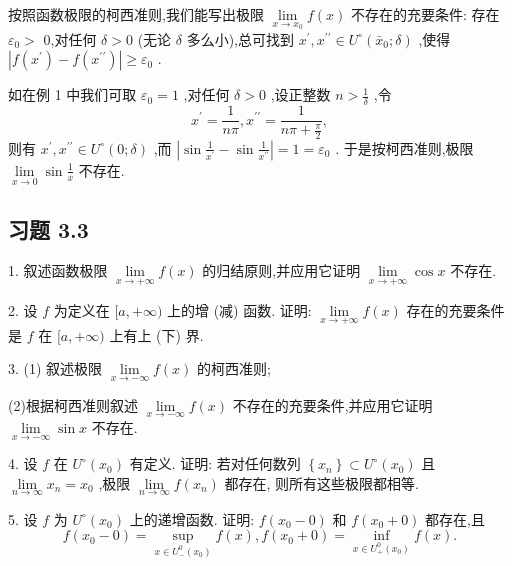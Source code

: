 按照函数极限的柯西准则,我们能写出极限 \(\mathop{\lim }\limits_{{x \rightarrow  {x}_{0}}}f\left( x\right)\) 不存在的充要条件: 存在 \({\varepsilon }_{0} >\) 0,对任何 \(\delta  > 0\) (无论 \(\delta\) 多么小),总可找到 \({x}^{\prime },{x}^{\prime \prime } \in  {U}^{ \circ  }\left( {{\bar{x}}_{0};\delta }\right)\) ,使得 \(\left| {f\left( {x}^{\prime }\right)  - f\left( {x}^{\prime \prime }\right) }\right|  \geq  {\varepsilon }_{0}\) .

如在例 1 中我们可取 \({\varepsilon }_{0} = 1\) ,对任何 \(\delta  > 0\) ,设正整数 \(n > \frac{1}{\delta }\) ,令
\[
{x}^{\prime } = \frac{1}{n\pi },{x}^{\prime \prime } = \frac{1}{{n\pi } + \frac{\pi }{2}},
\]
则有 \({x}^{\prime },{x}^{\prime \prime } \in  {U}^{ \circ  }\left( {0;\delta }\right)\) ,而 \(\left| {\sin \frac{1}{{x}^{\prime }} - \sin \frac{1}{{x}^{\prime \prime }}}\right|  = 1 = {\varepsilon }_{0}\) . 于是按柯西准则,极限 \(\mathop{\lim }\limits_{{x \rightarrow  0}}\sin \frac{1}{x}\) 不存在.

\subsection{习题 3.3}

1. 叙述函数极限 \(\mathop{\lim }\limits_{{x \rightarrow   + \infty }}f\left( x\right)\) 的归结原则,并应用它证明 \(\mathop{\lim }\limits_{{x \rightarrow   + \infty }}\cos x\) 不存在.

2. 设 \(f\) 为定义在 \(\lbrack a, + \infty )\) 上的增 (减) 函数. 证明: \(\mathop{\lim }\limits_{{x \rightarrow   + \infty }}f\left( x\right)\) 存在的充要条件是 \(f\) 在 \(\lbrack a, + \infty )\) 上有上 (下) 界.

3. (1) 叙述极限 \(\mathop{\lim }\limits_{{x \rightarrow   - \infty }}f\left( x\right)\) 的柯西准则;

(2)根据柯西准则叙述 \(\mathop{\lim }\limits_{{x \rightarrow   - \infty }}f\left( x\right)\) 不存在的充要条件,并应用它证明 \(\mathop{\lim }\limits_{{x \rightarrow   - \infty }}\sin x\) 不存在.

4. 设 \(f\) 在 \({U}^{ \circ  }\left( {x}_{0}\right)\) 有定义. 证明: 若对任何数列 \(\left\{  {x}_{n}\right\}   \subset  {U}^{ \circ  }\left( {x}_{0}\right)\) 且 \(\mathop{\lim }\limits_{{n \rightarrow  \infty }}{x}_{n} = {x}_{0}\) ,极限 \(\mathop{\lim }\limits_{{n \rightarrow  \infty }}f\left( {x}_{n}\right)\) 都存在, 则所有这些极限都相等.

5. 设 \(f\) 为 \({U}^{ \circ  }\left( {x}_{0}\right)\) 上的递增函数. 证明: \(f\left( {{x}_{0} - 0}\right)\) 和 \(f\left( {{x}_{0} + 0}\right)\) 都存在,且
\[
f\left( {{x}_{0} - 0}\right)  = \mathop{\sup }\limits_{{x \in  {U}_{ - }^{0}\left( {x}_{0}\right) }}f\left( x\right) ,f\left( {{x}_{0} + 0}\right)  = \mathop{\inf }\limits_{{x \in  {U}_{ + }^{0}\left( {x}_{0}\right) }}f\left( x\right) .
\]

